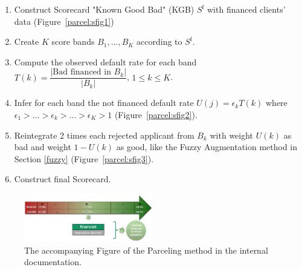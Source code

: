\begin{enumerate}
\item Construct Scorecard "Known Good Bad" (KGB) $S^{\text{f}}$ with financed clients' data (Figure~\ref{parcel:sfig1})
\item Create $K$ score bands $B_1, \ldots, B_K$ according to $S^{\text{f}}$.
\item Compute the observed default rate for each band $T(k) = \dfrac{|\text{Bad financed in } B_k|}{|B_k|}$, $1 \leq k  \leq K$.
\item Infer for each band the not financed default rate $U(j) = \epsilon_k T(k)$ where $\epsilon_1 > \ldots > \epsilon_k > \ldots > \epsilon_K > 1$ (Figure~\ref{parcel:sfig2}).
\item Reintegrate 2 times each rejected applicant from $B_k$ with weight $U(k)$ as bad and weight $1-U(k)$ as good, like the Fuzzy Augmentation method in Section \ref{fuzzy} (Figure~\ref{parcel:sfig3}).
\item Construct final Scorecard.
\end{enumerate}

\begin{figure}
\centering
\includegraphics[width=0.5\textwidth]{figures/appendix/processusParcelling.png}
\caption{The accompanying Figure of the Parceling method in the internal documentation.}
\label{fig:parceling}
\end{figure}


